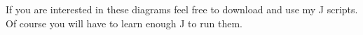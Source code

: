 If you are interested in these diagrams feel free to download and use my
J scripts. Of course you will have to learn enough J to run them.



%